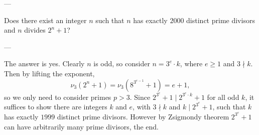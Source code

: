 
---

Does there exist an integer $n$ such that $n$ has exactly $2000$ distinct prime divisors and $n$ divides $2^n+1$?

---

The answer is yes. Clearly $n$ is odd, so consider $n=3^e\cdot k$, where $e\ge1$ and $3\nmid k$. Then  by lifting the exponent, \[\nu_3\left(2^n+1\right)=\nu_3\left(8^{3^{e-1}}+1\right)=e+1,\]
so we only need to consider primes $p>3$. Since $2^{3^e}+1\mid2^{3^e\cdot k}+1$ for all odd $k$, it suffices to show there are integers $k$ and $e$, with $3\nmid k$ and $k\mid2^{3^e}+1$, such that $k$ has exactly $1999$ distinct prime divisors. However by Zsigmondy theorem $2^{3^e}+1$ can have arbitrarily many prime divisors, the end.

